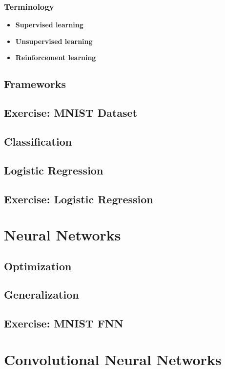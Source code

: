 \documentclass[aspectratio=169]{beamer}
\begin{document}
\begin{frame}
\frametitle{Terminology}
    \begin{itemize}
        \item \textbf{Supervised learning}
        \item \textbf{Unsupervised learning}
        \item \textbf{Reinforcement learning}
    \end{itemize}
\end{frame}


\subsection{Frameworks}
\subsection{Exercise: MNIST Dataset}
\subsection{Classification}
\subsection{Logistic Regression}
\subsection{Exercise: Logistic Regression}

\section{Neural Networks}

\subsection{Optimization}
\subsection{Generalization}
\subsection{Exercise: MNIST FNN}

\section{Convolutional Neural Networks}
\end{document}
